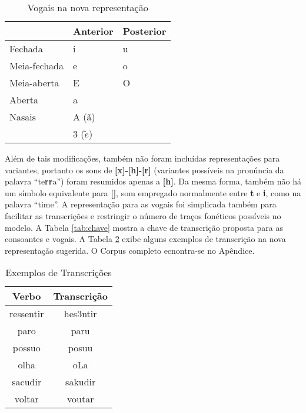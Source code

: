 \begin{center}
\begin{table}[H]
\begin{center}
    \begin{tabular}{lll}
        \hline
         & Anterior & Posterior \\
         \hline
        Fechada & i & u \\
        \hline
        Meia-fechada & e & o \\
        \hline
        Meia-aberta & E & O \\
        \hline
        Aberta & a &  \\
        \hline
        Nasais & A (ã) &\\ & 3 ($\tilde{e}$) &\\ 
        \hline
    \end{tabular}
\end{center}
\caption{Vogais na nova representação}
\label{tab:new_vocals}
\end{table}
\end{center}

Além de tais modificações, também não foram incluídas representações para variantes, portanto os sons de \textbf{[x]-[h]-[r]} (variantes possíveis na pronúncia da palavra “te\textbf{rr}a”) foram resumidos apenas a \textbf{[h]}. Da mesma forma, também não há um símbolo equivalente para \textbf{[]}, som empregado normalmente entre \textbf{t} e \textbf{i}, como na palavra “time”. A representação para as vogais foi simplicada também para facilitar as transcrições e restringir o número de traços fonéticos possíveis no modelo. A Tabela \ref{tab:chave} mostra a chave de transcrição proposta para as consoantes e vogais. A Tabela \ref{tab:transc} exibe alguns exemplos de transcrição na nova representação sugerida. O Corpus completo ecnontra-se no Apêndice.

\begin{table}[H]
\begin{center}
\begin{tabular}{cc}
\hline
\textbf{Verbo} & \textbf{Transcrição} \\ \hline
ressentir & hes3ntir \\
paro & paru \\
possuo & posuu \\
olha & oLa \\
sacudir & sakudir \\
voltar & voutar \\ \hline
\end{tabular}
\end{center}
\caption{Exemplos de Transcrições}
\label{tab:transc}
\end{table}


